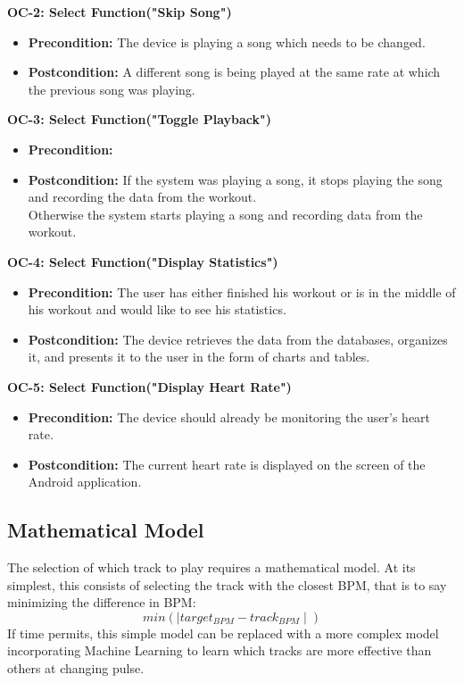 \documentclass[letterpaper,english, 12pt]{scrreprt}
\begin{document}
{\bf OC-2: Select Function("Skip Song")}
\begin{itemize}
	\item {\bf Precondition: } The device is playing a song which needs to be changed.
	\item {\bf Postcondition: } A different song is being played at the same rate at which the previous song was playing.

\end{itemize}

{\bf OC-3: Select Function("Toggle Playback")}
\begin{itemize}
	\item {\bf Precondition: }
	\item {\bf Postcondition: } If the system was playing a song, it stops playing the song and recording the data from the workout.\\
      Otherwise the system starts playing a song and recording data from the workout.

\end{itemize}

{\bf OC-4: Select Function("Display Statistics")}
\begin{itemize}
	\item {\bf Precondition: } The user has either finished his workout or is in the middle of his workout and would like to see his statistics.
	\item {\bf Postcondition: } The device retrieves the data from the databases, organizes it, and presents it to the user in the form of charts and tables.
\end{itemize}

{\bf OC-5: Select Function("Display Heart Rate")}
\begin{itemize}
	\item {\bf Precondition: } The device should already be monitoring the user's heart rate.
	\item {\bf Postcondition: } The current heart rate is displayed on the screen of the Android application.
\end{itemize}

\subsection{Mathematical Model}
The selection of which track to play requires a mathematical model. At its simplest, this consists of selecting the track with the closest BPM, that is to say minimizing the difference in BPM:
\begin{equation}
  min(\mid target_{BPM} - track_{BPM} \mid)
\end{equation}
If time permits, this simple model can be replaced with a more complex model incorporating Machine Learning to learn which tracks are more effective than others at changing pulse.
\end{document}

